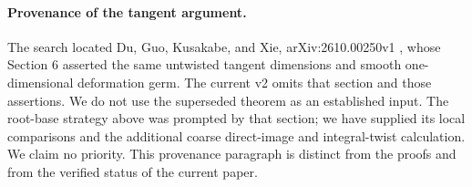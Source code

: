 \paragraph{Provenance of the tangent argument.}
The search located Du, Guo, Kusakabe, and Xie, arXiv:2610.00250v1
\cite{DuEtAl2026v1},
whose Section 6 asserted the same untwisted tangent dimensions and
smooth one-dimensional deformation germ. The current v2
\cite{DuEtAl2026v2} omits that
section and those assertions. We do not use the superseded theorem
as an established input. The root-base strategy above was prompted
by that section; we have supplied its local comparisons and the
additional coarse direct-image and integral-twist calculation. We
claim no priority. This provenance paragraph is distinct from the
proofs and from the verified status of the current paper.
